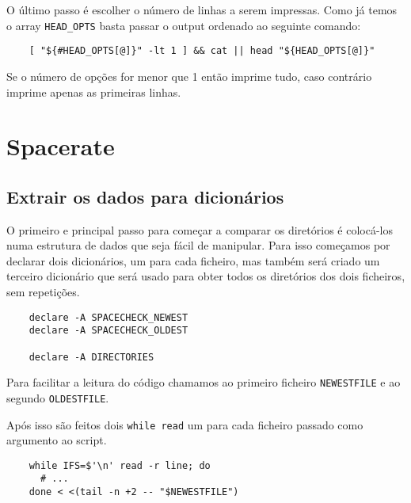 O último passo é escolher o número de linhas a serem impressas.
Como já temos o array \Verb|HEAD_OPTS| basta passar o output ordenado ao seguinte comando:

\begin{listing}[H]
  \begin{verbatim}
    [ "${#HEAD_OPTS[@]}" -lt 1 ] && cat || head "${HEAD_OPTS[@]}"
  \end{verbatim}
\end{listing}

Se o número de opções for menor que 1 então imprime tudo, caso contrário imprime apenas as primeiras linhas.

\section{Spacerate}

\subsection{Extrair os dados para dicionários}

O primeiro e principal passo para começar a comparar os diretórios é colocá-los numa estrutura de dados que seja fácil de manipular.
Para isso começamos por declarar dois dicionários, um para cada ficheiro, mas também será criado um terceiro dicionário que será usado para obter todos os diretórios dos dois ficheiros, sem repetições.

\begin{listing}[H]
  \begin{verbatim}
    declare -A SPACECHECK_NEWEST
    declare -A SPACECHECK_OLDEST

    declare -A DIRECTORIES
  \end{verbatim}
\end{listing}

Para facilitar a leitura do código chamamos ao primeiro ficheiro \Verb|NEWESTFILE| e ao segundo \Verb|OLDESTFILE|.

Após isso são feitos dois \texttt{while read} um para cada ficheiro passado como argumento ao script.

\begin{listing}[H]
  \begin{verbatim}
    while IFS=$'\n' read -r line; do
      # ...
    done < <(tail -n +2 -- "$NEWESTFILE")
  \end{verbatim}
\end{listing}

